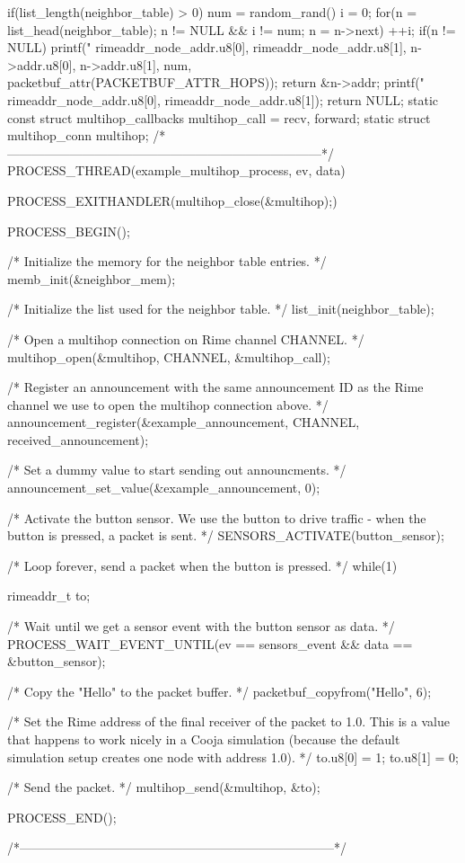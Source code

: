 \begin{DoxyCodeInclude}
{  if(list_length(neighbor_table) > 0) {
    num = random_rand() %
    i = 0;
    for(n = list_head(neighbor_table); n != NULL && i != num; n = n->next) {
      ++i;
    }
    if(n != NULL) {
      printf("%
             rimeaddr_node_addr.u8[0], rimeaddr_node_addr.u8[1],
             n->addr.u8[0], n->addr.u8[1], num,
             packetbuf_attr(PACKETBUF_ATTR_HOPS));
      return &n->addr;
    }
  }
  printf("%
         rimeaddr_node_addr.u8[0], rimeaddr_node_addr.u8[1]);
  return NULL;
}
static const struct multihop_callbacks multihop_call = {recv, forward};
static struct multihop_conn multihop;
/*---------------------------------------------------------------------------*/
PROCESS_THREAD(example_multihop_process, ev, data)
{
  PROCESS_EXITHANDLER(multihop_close(&multihop);)
    
  PROCESS_BEGIN();

  /* Initialize the memory for the neighbor table entries. */
  memb_init(&neighbor_mem);

  /* Initialize the list used for the neighbor table. */
  list_init(neighbor_table);

  /* Open a multihop connection on Rime channel CHANNEL. */
  multihop_open(&multihop, CHANNEL, &multihop_call);

  /* Register an announcement with the same announcement ID as the
     Rime channel we use to open the multihop connection above. */
  announcement_register(&example_announcement,
                        CHANNEL,
                        received_announcement);

  /* Set a dummy value to start sending out announcments. */
  announcement_set_value(&example_announcement, 0);

  /* Activate the button sensor. We use the button to drive traffic -
     when the button is pressed, a packet is sent. */
  SENSORS_ACTIVATE(button_sensor);

  /* Loop forever, send a packet when the button is pressed. */
  while(1) {
    rimeaddr_t to;

    /* Wait until we get a sensor event with the button sensor as data. */
    PROCESS_WAIT_EVENT_UNTIL(ev == sensors_event &&
                             data == &button_sensor);

    /* Copy the "Hello" to the packet buffer. */
    packetbuf_copyfrom("Hello", 6);

    /* Set the Rime address of the final receiver of the packet to
       1.0. This is a value that happens to work nicely in a Cooja
       simulation (because the default simulation setup creates one
       node with address 1.0). */
    to.u8[0] = 1;
    to.u8[1] = 0;

    /* Send the packet. */
    multihop_send(&multihop, &to);

  }

  PROCESS_END();
}
/*---------------------------------------------------------------------------*/
\end{DoxyCodeInclude}
 
